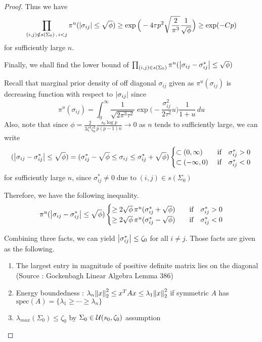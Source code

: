 \begin{proof}
    Thus we have
    \begin{equation} \label{offdiagonal zeros ineq}
        \prod_{(i,j) \notin s(\Sigma_0)\, ,\, i<j}\pi^u(\abs{\sigma_{ij}}\leq \sqrt \phi) \geq \exp\Big(-4\tau p^2 \sqrt{\frac{2}{\pi^3}} \frac{1}{\sqrt{\phi}} \Big) \geq \exp(- Cp)
    \end{equation}
    for sufficiently large $n$.

    Finally, we shall find the lower bound of $\prod_{(i,j)\in s(\Sigma_0)}\pi^u(\abs{\sigma_{ij} - \sigma_{ij}^*}\leq \sqrt \phi)$

    Recall that marginal prior density of off diagonal $\sigma_{ij}$ given as $\pi^u(\sigma_{ij})$ is decreasing function with respect to $\abs{\sigma_{ij}}$ since \[ \pi^u(\sigma_{ij})= \int_0^\infty \frac{1}{\sqrt{2\pi^3 \tau^2}} \exp\Big(-\frac{\sigma_{ij}^2}{2\tau^2} u \Big) \frac{1}{1+u} \, du \] 
    Also, note that since $\phi = \frac{2}{3\zeta^4\zeta_0^2}\frac{s_0\log p}{p(p-1)n}\rightarrow 0 $ as $n$ tends to sufficiently large, we can write 
    \begin{equation*}
        (\abs{\sigma_{ij}- \sigma_{ij}^*}\leq \sqrt\phi) = (\sigma_{ij}^* - \sqrt\phi \leq \sigma_{ij} \leq \sigma_{ij}^* + \sqrt \phi) \begin{cases}\subset (0, \infty) & \; \text{if} \quad \sigma_{ij}^* >0 \\
        \subset (-\infty, 0) &\; \text{if} \quad \sigma_{ij}^* <0
        \end{cases}
    \end{equation*}
    for sufficiently large $n$, since $\sigma_{ij}^* \neq 0 \; \text{due to} \;  (i, j)\in s(\Sigma_0)$

    Therefore, we have the following inequality.
    \begin{align*}
       \pi^u(\abs{\sigma_{ij} - \sigma_{ij}^*}\leq \sqrt \phi) \begin{cases}
        \geq 2\sqrt{\phi} \, \pi^u(\sigma_{ij}^* + \sqrt{\phi}) & \quad \text{if} \quad \sigma_{ij}^* >0 \\
        \geq 2\sqrt{\phi} \, \pi^u(\sigma_{ij}^* - \sqrt{\phi}) & \quad \text{if} \quad \sigma_{ij}^* <0 
        \end{cases}
    \end{align*}

    Combining three facts, we can yield $\abs{\sigma_{ij}^*} \leq \zeta_0$ for all $i\neq j$. Those facts are given as the following.
    \begin{enumerate}
        \item The largest entry in magnitude of positive definite matrix lies on the diagonal (Source : Gockenbagh Linear Algebra Lemma 386)
        \item Energy boundedness : $\lambda_n \norm{x}_2^2 \leq x^T A x \leq \lambda_1 \norm{x}_2^2$ if symmetric $A$ has $\text{spec}(A) = \{\lambda_1\geq \cdots \geq \lambda_n\}$
        \item $\lambda_{max}(\Sigma_0)\leq \zeta_0$ by $\Sigma_0 \in \mathcal{U}(s_0, \zeta_0)$ assumption
    \end{enumerate}


\end{proof}
